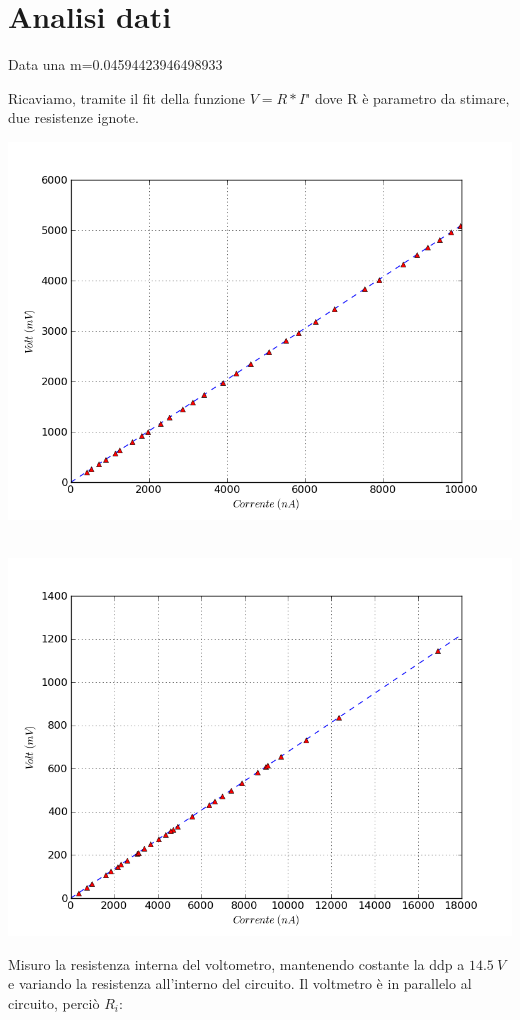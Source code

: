 \section{Analisi dati}

Data una 
m=0.04594423946498933

Ricaviamo, tramite  il fit della funzione $V=R*I$" dove R è parametro da stimare, due resistenze ignote.


\includegraphics[scale=0.75]{grafici/C1/res1.png}
\

\includegraphics[scale=0.75]{grafici/C1/res2.png}

Misuro la resistenza interna del voltometro, mantenendo costante la ddp a $14.5\ V$ e variando la resistenza all'interno del circuito. 
Il voltmetro è in parallelo al circuito, perciò $R_i$:

